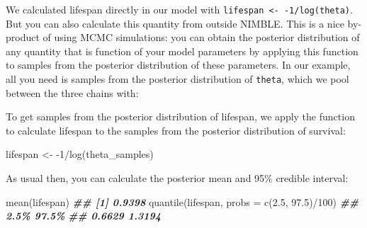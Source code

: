 \documentclass[
  12pt,
]{krantz}
\newenvironment{Shaded}{\begin{snugshade}}{\end{snugshade}}
\newcommand{\AttributeTok}[1]{\textcolor[rgb]{0.77,0.63,0.00}{#1}}
\newcommand{\DecValTok}[1]{\textcolor[rgb]{0.00,0.00,0.81}{#1}}
\newcommand{\DocumentationTok}[1]{\textcolor[rgb]{0.56,0.35,0.01}{\textbf{\textit{#1}}}}
\newcommand{\FloatTok}[1]{\textcolor[rgb]{0.00,0.00,0.81}{#1}}
\newcommand{\FunctionTok}[1]{\textcolor[rgb]{0.00,0.00,0.00}{#1}}
\newcommand{\NormalTok}[1]{#1}
\newcommand{\OtherTok}[1]{\textcolor[rgb]{0.56,0.35,0.01}{#1}}
\newcommand{\SpecialCharTok}[1]{\textcolor[rgb]{0.00,0.00,0.00}{#1}}
\newcommand{\StringTok}[1]{\textcolor[rgb]{0.31,0.60,0.02}{#1}}
\begin{document}
We calculated lifespan directly in our model with \texttt{lifespan\ \textless{}-\ -1/log(theta)}. But you can also calculate this quantity from outside NIMBLE. This is a nice by-product of using MCMC simulations: you can obtain the posterior distribution of any quantity that is function of your model parameters by applying this function to samples from the posterior distribution of these parameters. In our example, all you need is samples from the posterior distribution of \texttt{theta}, which we pool between the three chains with:

\begin{Shaded}
\end{Shaded}

To get samples from the posterior distribution of lifespan, we apply the function to calculate lifespan to the samples from the posterior distribution of survival:

\begin{Shaded}
\begin{Highlighting}[]
\NormalTok{lifespan }\OtherTok{\textless{}{-}} \SpecialCharTok{{-}}\DecValTok{1}\SpecialCharTok{/}\FunctionTok{log}\NormalTok{(theta\_samples)}
\end{Highlighting}
\end{Shaded}

As usual then, you can calculate the posterior mean and 95\% credible interval:

\begin{Shaded}
\begin{Highlighting}[]
\FunctionTok{mean}\NormalTok{(lifespan)}
\DocumentationTok{\#\# [1] 0.9398}
\FunctionTok{quantile}\NormalTok{(lifespan, }\AttributeTok{probs =} \FunctionTok{c}\NormalTok{(}\FloatTok{2.5}\NormalTok{, }\FloatTok{97.5}\NormalTok{)}\SpecialCharTok{/}\DecValTok{100}\NormalTok{)}
\DocumentationTok{\#\#   2.5\%  97.5\% }
\DocumentationTok{\#\# 0.6629 1.3194}
\end{Highlighting}
\end{Shaded}
\end{document}
